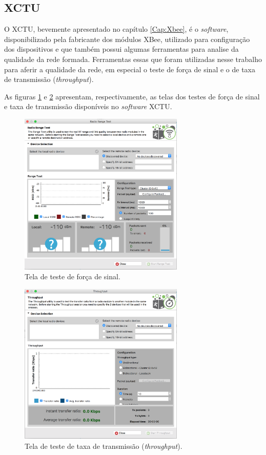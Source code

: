 \subsection{XCTU}

O XCTU, bevemente apresentado no capítulo \ref{Cap:Xbee}, é o \emph{software}, disponibilizado pela fabricante dos módulos XBee, utilizado para configuração dos dispositivos e que também possui algumas ferramentas para analise da qualidade da rede formada. Ferramentas essas que foram utilizadas nesse trabalho para aferir a qualidade da rede, em especial o teste de força de sinal e o de taxa de transmissão (\emph{throughput}).

As figuras \ref{fig:rangeTest} e \ref{fig:throughput} apresentam, respectivamente, as telas dos testes de força de sinal e taxa de transmissão disponíveis no \emph{software} XCTU.

\begin{figure}[h!] 
\center
\includegraphics[width=0.7\textwidth]{RangeTest.png}
\caption{Tela de teste de força de sinal.} 
\label{fig:rangeTest}
\end{figure}

\begin{figure}[h!] 
\center
\includegraphics[width=0.7\textwidth]{ThroughputTest.png}
\caption{Tela de teste de taxa de transmissão (\emph{throughput}).} 
\label{fig:throughput}
\end{figure}

